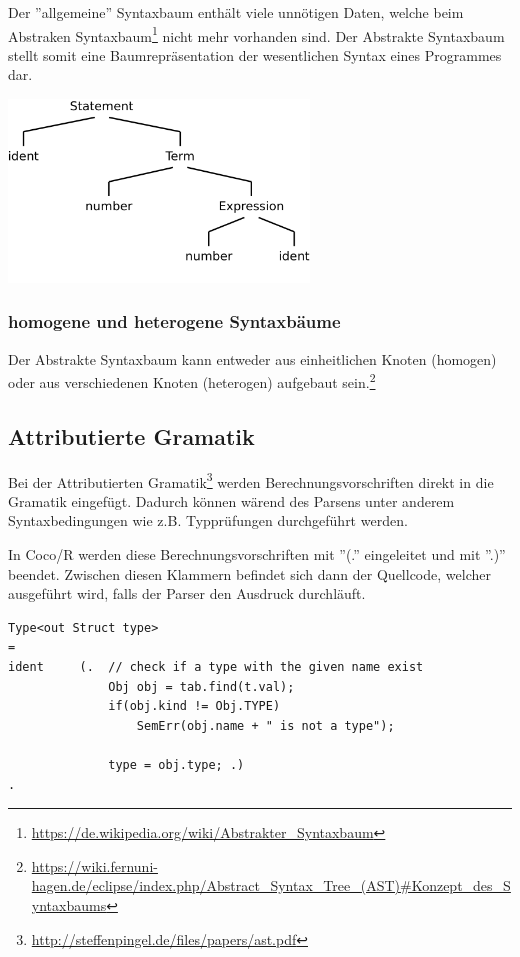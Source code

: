 Der ''allgemeine'' Syntaxbaum enth\"alt viele unn\"otigen Daten, welche beim Abstraken Syntaxbaum\footnote{\url{https://de.wikipedia.org/wiki/Abstrakter_Syntaxbaum}} nicht mehr vorhanden sind. Der Abstrakte Syntaxbaum stellt somit eine Baumrepr\"asentation der wesentlichen Syntax eines Programmes dar.

\includegraphics[width=0.6\textwidth]{./media/images/compiler/abstract_syntaxtree.png}

\subsubsection{homogene und heterogene Syntaxbäume}

Der Abstrakte Syntaxbaum kann entweder aus einheitlichen Knoten (homogen) oder aus verschiedenen Knoten (heterogen) aufgebaut sein.\footnote{\url{https://wiki.fernuni-hagen.de/eclipse/index.php/Abstract_Syntax_Tree_(AST)\#Konzept_des_Syntaxbaums}}

\subsection{Attributierte Gramatik}

Bei der Attributierten Gramatik\footnote{\url{http://steffenpingel.de/files/papers/ast.pdf}} werden Berechnungsvorschriften direkt in die Gramatik eingef\"ugt. Dadurch k\"onnen w\"arend des Parsens unter anderem Syntaxbedingungen wie z.B. Typpr\"ufungen durchgef\"uhrt werden.

In Coco/R werden diese Berechnungsvorschriften mit ''(.'' eingeleitet und mit ''.)'' beendet. Zwischen diesen Klammern befindet sich dann der Quellcode, welcher ausgef\"uhrt wird, falls der Parser den Ausdruck durchl\"auft.


\begin{lstlisting}[language=EBNF]
Type<out Struct type>
= 
ident     (.  // check if a type with the given name exist
              Obj obj = tab.find(t.val);
              if(obj.kind != Obj.TYPE)
                  SemErr(obj.name + " is not a type");

              type = obj.type; .)
. 
\end{lstlisting}

